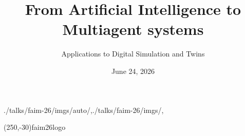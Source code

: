 

\date{June 24, 2026}

\title{From Artificial Intelligence to Multiagent systems}
\subtitle{Applications to Digital Simulation and Twins}


\usefootlinewithsections

\begin{graphicspathcontext}{{./talks/faim-26/imgs/auto/},{./talks/faim-26/imgs/},\old}

	\settitlepagerightfigure(250,-30){faim26logo}


\end{graphicspathcontext}





\OECDAItrue
\EUAIActfalse

\endinput
